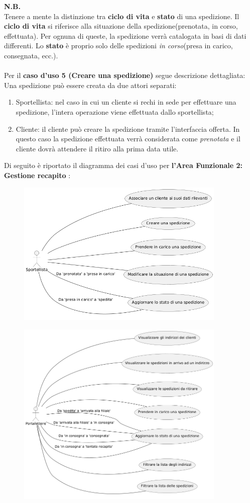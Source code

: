 \documentclass[a4paper,12pt]{article}
\begin{document}
  \textbf{N.B.} \\
  Tenere a mente la distinzione tra \textbf{ciclo di vita} e \textbf{stato} di una spedizione. Il \textbf{ciclo di vita} si riferisce
  alla situazione della spedizione(prenotata, in corso, effettuata). Per ognuna di queste, la spedizione verrà catalogata in basi di dati differenti.
  Lo \textbf{stato} è proprio solo delle spedizioni \textit{in corso}(presa in carico, consegnata, ecc.).
  \\ \\
  Per il \textbf{caso d'uso 5 (Creare una spedizione)} segue descrizione dettagliata: \\
  Una spedizione può essere creata da due attori separati:
  \begin{enumerate}
    \item{Sportellista}: nel caso in cui un cliente si rechi in sede per effettuare una spedizione, l'intera operazione viene effettuata dallo sportellista;
    \item{Cliente}: il cliente può creare la spedizione tramite l'interfaccia offerta. In questo caso la spedizione effettuata verrà considerata come \textit{prenotata}
      e il cliente dovrà attendere il ritiro alla prima data utile.

  \end{enumerate}
  Di seguito è riportato il diagramma dei casi d'uso per \textbf{l'Area Funzionale 2: Gestione recapito} :
  \begin{figure}[H]
    \centering
    \includegraphics[width=10cm]{assets/usecase_recapito_1.png}
  \end{figure}
  \begin{figure}[H]
    \centering
    \includegraphics[width=10cm]{assets/usecase_recapito_2.png}
  \end{figure}
\end{document}
